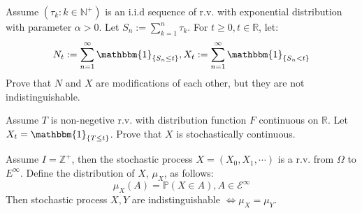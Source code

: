 \documentclass{ctexart}
\begin{document}
\begin{problem}\label{pro:4}
Assume \((\tau_k:k \in \mathbb{N}^+)\) is an i.i.d sequence of r.v. with exponential distribution with parameter \(\alpha>0\).
Let \(S_n:=\sum_{k=1}^{n}\tau_k\). For \(t \geq 0,t \in \mathbb{R}\), let:
\[
	N_t:=\sum_{n=1}^{\infty}\mathbbm{1}_{\{S_n \leq t\}},
	X_t:=\sum_{n=1}^{\infty}\mathbbm{1}_{\{S_n < t\}}
\]
Prove that \(N\) and \(X\) are modifications of each other, but they are not indistinguishable.
\end{problem}

\begin{problem}\label{pro:5}
Assume \(T\) is non-negetive r.v. with distribution function \(F\) continuous on \(\mathbb{R}\).
Let \(X_t=\mathbbm{1}_{\{T \leq t\}}\).
Prove that \(X\) is stochastically continuous.
\end{problem}
\begin{problem}\label{pro:6}
Assume \(I=\mathbb{Z}^+\), then the stochastic process \(X=(X_0,X_1,\cdots)\) is a r.v. from \(\Omega\) to \(E^\infty\).
Define the distribution of \(X\), \(\mu_X\), as follows:
\[
	\mu_X(A)=\mathbb{P}(X \in A),A \in \mathscr{E}^\infty
\]
Then stochastic process \(X,Y\) are indistinguishable \(\iff \mu_X=\mu_Y\).
\end{problem}
\end{document}
